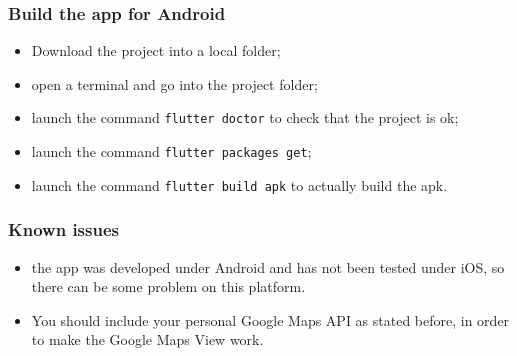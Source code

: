 \subsubsection{Build the app for Android}
\begin{itemize}
    \item Download the project into a local folder;
    \item open a terminal and go into the project folder;
    \item launch the command \texttt{flutter doctor} to check that the project is ok;
    \item launch the command \texttt{flutter packages get};
    \item launch the command \texttt{flutter build apk} to actually build the apk.
\end{itemize}

\subsubsection{Known issues}
\begin{itemize}
    \item the app was developed under Android and has not been tested under iOS, so there can be some problem on this platform.
    \item You should include your personal Google Maps API as stated before, in order to make the Google Maps View work.
\end{itemize}
